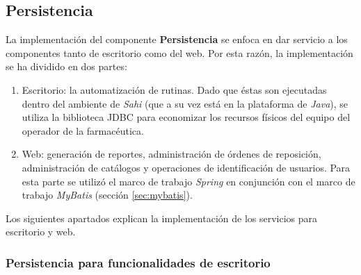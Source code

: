 \subsection{Persistencia}\label{sec:persistence}
La implementación del componente \textbf{Persistencia} se enfoca en dar servicio a los componentes tanto de escritorio como del web. Por esta razón, la implementación se ha dividido en dos partes:
\begin{enumerate}
 	\item Escritorio: la automatización de rutinas. Dado que éstas son ejecutadas dentro del ambiente de \textit{Sahi} (que a su vez está en la plataforma de \textit{Java}), se utiliza la biblioteca JDBC para economizar los recursos físicos del equipo del operador de la farmacéutica.
 	\item Web: generación de reportes, administración de órdenes de reposición, administración de catálogos y operaciones de identificación  de usuarios. Para esta parte se utilizó el marco de trabajo \textit{Spring} en conjunción con el marco de trabajo \textit{MyBatis} (sección \ref{sec:mybatis}).
\end{enumerate}
Los siguientes apartados explican la implementación de los servicios para escritorio y web.
\subsubsection{Persistencia para funcionalidades de escritorio}
